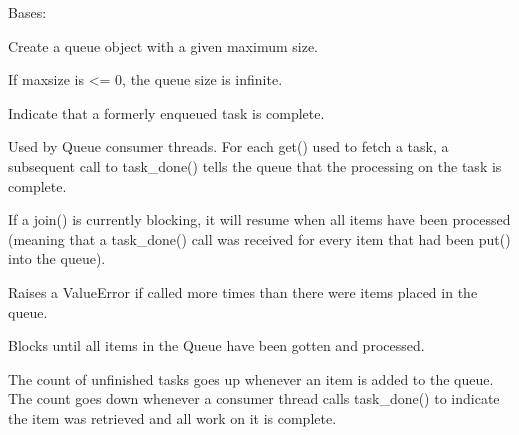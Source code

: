 \documentclass[letterpaper,10pt,english]{sphinxmanual}
\begin{document}
\begin{fulllineitems}
\label{\detokenize{queue:queue.Queue}}
\pysigstartsignatures
{}
\pysigstopsignatures
\sphinxAtStartPar
Bases: 

\sphinxAtStartPar
Create a queue object with a given maximum size.

\sphinxAtStartPar
If maxsize is \textless{}= 0, the queue size is infinite.

\begin{fulllineitems}
\label{\detokenize{queue:queue.Queue.task_done}}
\pysigstartsignatures
{}
\pysigstopsignatures
\sphinxAtStartPar
Indicate that a formerly enqueued task is complete.

\sphinxAtStartPar
Used by Queue consumer threads.  For each get() used to fetch a task,
a subsequent call to task\_done() tells the queue that the processing
on the task is complete.

\sphinxAtStartPar
If a join() is currently blocking, it will resume when all items
have been processed (meaning that a task\_done() call was received
for every item that had been put() into the queue).

\sphinxAtStartPar
Raises a ValueError if called more times than there were items
placed in the queue.

\end{fulllineitems}


\begin{fulllineitems}
\label{\detokenize{queue:queue.Queue.join}}
\pysigstartsignatures
{}
\pysigstopsignatures
\sphinxAtStartPar
Blocks until all items in the Queue have been gotten and processed.

\sphinxAtStartPar
The count of unfinished tasks goes up whenever an item is added to the
queue. The count goes down whenever a consumer thread calls task\_done()
to indicate the item was retrieved and all work on it is complete.


\end{fulllineitems}
\end{fulllineitems}
\end{document}
